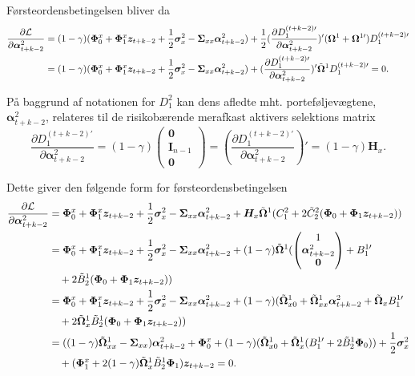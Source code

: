 \documentclass[
  a4paper,
  oneside]{memoir}
\begin{document}
Førsteordensbetingelsen bliver da
\begin{align*}
\frac{\partial \mathcal{L}}{\partial\bm{\alpha}_{t+k-2}^2 }&=(1-\gamma) (\bm{\Phi}_0^x+\bm{\Phi}_1^x\bm{z}_{t+k-2} + \frac{1}{2} \bm{\sigma}_x^2 -\bm{\Sigma}_{xx}\bm{\alpha}_{t+k-2}^2 ) + \frac{1}{2} (\frac{\partial D_1^{(t+k-2)\prime}}{\partial \bm{\alpha}_{t+k-2}^2})' (\bm{\Omega}^1+\bm{\Omega}^{1\prime}) D_1^{(t+k-2)\prime}\\
                                                           &=(1-\gamma) (\bm{\Phi}_0^x+\bm{\Phi}_1^x\bm{z}_{t+k-2} + \frac{1}{2} \bm{\sigma}_x^2 -\bm{\Sigma}_{xx}\bm{\alpha}_{t+k-2}^2 ) + (\frac{\partial D_1^{(t+k-2)\prime}}{\partial \bm{\alpha}_{t+k-2}^2})' \Tilde{\bm{\Omega}}^1 D_1^{(t+k-2)\prime} = 0.
\end{align*}

På baggrund af notationen for \(D_1^2\) kan dens afledte mht. porteføljevægtene, \(\bm{\alpha}_{t+k-2}^2\), relateres til de risikobærende merafkast aktivers selektions matrix
\[\frac{\partial D_1^{(t+k-2)\prime}}{\partial \bm{\alpha}_{t+k-2}^2} = (1-\gamma) \begin{pmatrix} \bm{0} \\ \bm{I}_{n-1} \\ \bm{0}\end{pmatrix}=(\frac{\partial D_1^{(t+k-2)\prime}}{\partial \bm{\alpha}_{t+k-2}^2})' = (1-\gamma)\bm{H}_x.\]

Dette giver den følgende form for førsteordensbetingelsen
\begin{align*}
\frac{\partial \mathcal{L}}{\partial\bm{\alpha}_{t+k-2}^2 }&= \bm{\Phi}_0^x+\bm{\Phi}_1^x\bm{z}_{t+k-2}+\frac{1}{2} \bm{\sigma}_x^2 -\bm{\Sigma}_{xx}\bm{\alpha}_{t+k-2}^2 +\bm{H}_x\Tilde{\bm{\Omega}}^{1}(C_1^2+ 2\Tilde{C}_2^2 (\bm{\Phi}_0+\bm{\Phi}_1\bm{z}_{t+k-2}))\\
&=\bm{\Phi}_0^x+\bm{\Phi}_1^x\bm{z}_{t+k-2}+\frac{1}{2} \bm{\sigma}_x^2 -\bm{\Sigma}_{xx}\bm{\alpha}_{t+k-2}^2 + (1-\gamma)\Tilde{\bm{\Omega}}^{1} (\begin{pmatrix} 1\\ \bm{\alpha}_{t+k-2}^2 \\ \bm{0} \end{pmatrix} + B_1^{1\prime}\\
&\quad + 2\Tilde{B}_2^1 (\bm{\Phi}_0+\bm{\Phi}_1\bm{z}_{t+k-2}))\\
&=\bm{\Phi}_0^x+\bm{\Phi}_1^x\bm{z}_{t+k-2}+\frac{1}{2} \bm{\sigma}_x^2 -\bm{\Sigma}_{xx}\bm{\alpha}_{t+k-2}^2 + (1-\gamma)(\Tilde{\bm{\Omega}}_{x0}^{1} + \Tilde{\bm{\Omega}}_{xx}^{1} \bm{\alpha}_{t+k-2}^2 + \Tilde{\bm{\Omega}}_{x} B_1^{1\prime}\\
&\quad + 2\Tilde{\bm{\Omega}}_{x}^1 \Tilde{B}_2^1 (\bm{\Phi}_0+\bm{\Phi}_1\bm{z}_{t+k-2}))\\
&=((1-\gamma)\Tilde{\bm{\Omega}}_{xx}^{1} - \bm{\Sigma}_{xx} )  \bm{\alpha}_{t+k-2}^2 + \bm{\Phi}_0^x + (1-\gamma)(\Tilde{\bm{\Omega}}_{x0}^{1} + \Tilde{\bm{\Omega}}_{x}^{1}(B_1^{1\prime} + 2\Tilde{B}_2^{1}\bm{\Phi}_0))+ \frac{1}{2} \bm{\sigma}_x^2\\
&\quad + (\bm{\Phi}_1^x + 2(1-\gamma)\Tilde{\bm{\Omega}}_{x}^{1} \Tilde{B}_2^1\bm{\Phi}_1 )\bm{z}_{t+k-2}=0.
\end{align*}
\end{document}
